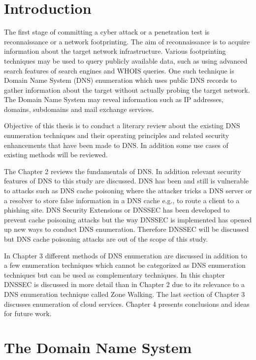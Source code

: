 
\section{Introduction}

The first stage of committing a cyber attack or a penetration test is reconnaissance or a network footprinting. The aim of reconnaissance is to acquire information about the target network infrastructure. Various footprinting techniques may be used to query publicly available data, such as using advanced search features of search engines and WHOIS queries. One such technique is Domain Name System (DNS) enumeration which uses public DNS records to gather information about the target without actually probing the target network. The Domain Name System may reveal information such as IP addresses, domains, subdomains and mail exchange services.

Objective of this thesis is to conduct a literary review about the existing DNS enumeration techniques and their operating principles and related security enhancements that have been made to DNS. In addition some use cases of existing methods will be reviewed.

The Chapter 2 reviews the fundamentals of DNS. In addition relevant security features of DNS to this study are discussed. DNS has been and still is vulnerable to attacks such as DNS cache poisoning where the attacker tricks a DNS server or a resolver to store false information in a DNS cache e.g., to route a client to a phishing site. DNS Security Extensions or DNSSEC has been developed to prevent cache poisoning attacks but the way DNSSEC is implemented has opened up new ways to conduct DNS enumeration. Therefore DNSSEC will be discussed but DNS cache poisoning attacks are out of the scope of this study.

In Chapter 3 different methods of DNS enumeration are discussed in addition to a few enumeration techniques which cannot be categorized as DNS enumeration techniques but can be used as complementary techniques. In this chapter DNSSEC is discussed in more detail than in Chapter 2 due to its relevance to a DNS enumeration technique called Zone Walking. The last section of Chapter 3 discusses enumeration of cloud services. Chapter 4 presents conclusions and ideas for future work.


\section{The Domain Name System}

